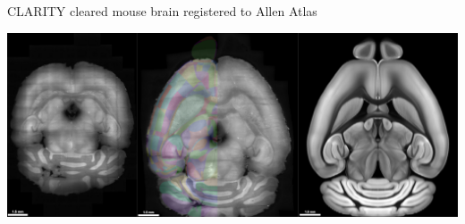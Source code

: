 \documentclass{beamer}
\begin{document}
\begin{frame}{CLARITY cleared mouse brain registered to Allen Atlas}

\includegraphics[width=\textwidth]{CLARITY_mouse_registration.png}

\end{frame}
\end{document}
